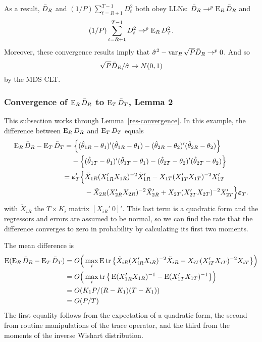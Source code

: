\documentclass[12pt,draft]{article}
\begin{document}
As a result, $\bar{D}_{R}$ and $(1/P) \sum_{t=R+1}^{T-1} D_t^2$ both obey
LLNs: $\bar{D}_{R} \to^p \operatorname{E}_R \bar{D}_{R}$ and
\begin{equation*}
  (1/P) \sum_{t=R+1}^{T-1} D_t^2 \to^p \operatorname{E}_R D_T^2.
\end{equation*}
Moreover, these convergence results imply that $\hat{\sigma}^2 - \operatorname{var}_R
\sqrt{P} \bar{D}_{R} \to^p 0$. And so
\begin{equation*}
  \sqrt{P} \bar{D}_{R}/\hat{\sigma} \to N(0,1)
\end{equation*}
by the MDS CLT.

\subsubsection*{Convergence of $\operatorname{E}_R \bar{D}_{R}$ to $\operatorname{E}_T \bar{D}_{T}$, Lemma 2}

This subsection works through Lemma~\ref{res-convergence}. In this
example, the difference between $\operatorname{E}_R \bar{D}_{R}$ and $\operatorname{E}_T \bar{D}_{T}$ equals
\begin{equation*}
  \begin{split}
    \operatorname{E}_R \bar{D}_{R} - \operatorname{E}_T \bar{D}_{T} &= \Big\{(\hat\theta_{1R} - \theta_1)'(\hat\theta_{1R} -
    \theta_1) -
    (\hat\theta_{2R} - \theta_2)'(\hat\theta_{2R} - \theta_2)\Big\} \\
    & \quad - \Big\{(\hat\theta_{1T} - \theta_1)'(\hat\theta_{1T} - \theta_1) -
    (\hat\theta_{2T} - \theta_2)'(\hat\theta_{2T} - \theta_2)\Big\} \\
    &\begin{split}
      =\boldsymbol{\varepsilon}_{T}'\Big\{
      & \tilde{X}_{1R}(X_{1R}'X_{1R})^{-2} \tilde{X}_{1R}'
      - X_{1T}(X_{1T}'X_{1T})^{-2} X_{1T}' \\
      & - \tilde{X}_{2R}(X_{2R}'X_{2R})^{-2} \tilde{X}_{2R}'
      + X_{2T}(X_{2T}'X_{2T})^{-2} X_{2T}'
      \Big\}\boldsymbol{\varepsilon}_{T}.
    \end{split}
  \end{split}
\end{equation*}
with $\tilde{X}_{iR}$ the $T \times K_i$ matrix $[X_{iR}'\ 0]'$. This
last term is a quadratic form and the regressors and errors are
assumed to be normal, so we can find the rate that the difference
converges to zero in probability by calculating its first two moments.

The mean difference is
\begin{equation*}
  \begin{split}
  \operatorname{E}(\operatorname{E}_R \bar{D}_{R} - \operatorname{E}_T \bar{D}_{T})
      &=O\Big(\max_i \operatorname{E} \operatorname{tr} \big\{
        \tilde{X}_{iR}(X_{iR}'X_{iR})^{-2} \tilde{X}_{iR}
        - X_{iT}(X_{iT}'X_{iT})^{-2} X_{iT} \big\} \Big) \\
      &=O\Big(\max_i \operatorname{tr} \big\{\operatorname{E} (X_{1R}'X_{1R})^{-1}
         - \operatorname{E} (X_{1T}'X_{1T})^{-1} \big\}\Big) \\
      &=O( K_1 P / (R-K_1)(T-K_1)) \\
      &=O(P/T)
    \end{split}
\end{equation*}
The first equality follows from the expectation of a quadratic form,
the second from routine manipulations of the trace operator, and the
third from the moments of the inverse Wishart distribution.
\end{document}

